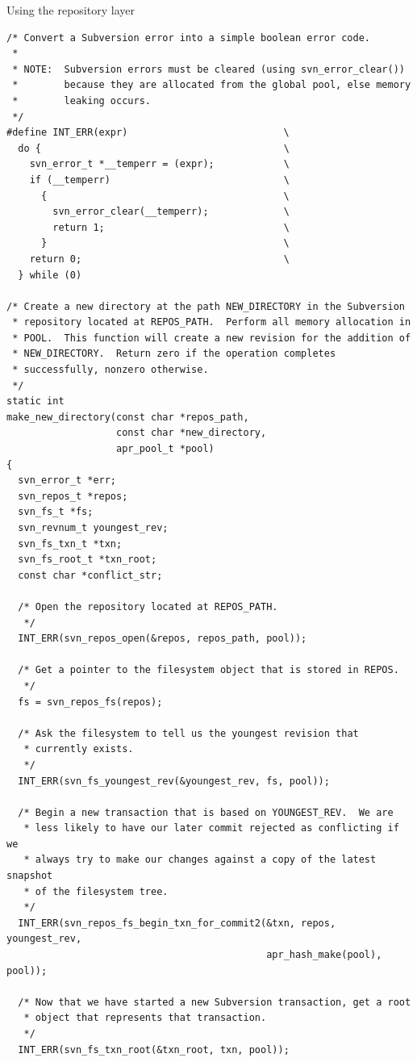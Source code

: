 \protect{}\label{svn.developer.layerlib.repos.ex-1}
Using the repository layer

\begin{verbatim}
/* Convert a Subversion error into a simple boolean error code.
 *
 * NOTE:  Subversion errors must be cleared (using svn_error_clear())
 *        because they are allocated from the global pool, else memory
 *        leaking occurs.
 */
#define INT_ERR(expr)                           \
  do {                                          \
    svn_error_t *__temperr = (expr);            \
    if (__temperr)                              \
      {                                         \
        svn_error_clear(__temperr);             \
        return 1;                               \
      }                                         \
    return 0;                                   \
  } while (0)

/* Create a new directory at the path NEW_DIRECTORY in the Subversion
 * repository located at REPOS_PATH.  Perform all memory allocation in
 * POOL.  This function will create a new revision for the addition of
 * NEW_DIRECTORY.  Return zero if the operation completes
 * successfully, nonzero otherwise.
 */
static int
make_new_directory(const char *repos_path,
                   const char *new_directory,
                   apr_pool_t *pool)
{
  svn_error_t *err;
  svn_repos_t *repos;
  svn_fs_t *fs;
  svn_revnum_t youngest_rev;
  svn_fs_txn_t *txn;
  svn_fs_root_t *txn_root;
  const char *conflict_str;

  /* Open the repository located at REPOS_PATH. 
   */
  INT_ERR(svn_repos_open(&repos, repos_path, pool));

  /* Get a pointer to the filesystem object that is stored in REPOS. 
   */
  fs = svn_repos_fs(repos);

  /* Ask the filesystem to tell us the youngest revision that
   * currently exists. 
   */
  INT_ERR(svn_fs_youngest_rev(&youngest_rev, fs, pool));

  /* Begin a new transaction that is based on YOUNGEST_REV.  We are
   * less likely to have our later commit rejected as conflicting if we
   * always try to make our changes against a copy of the latest snapshot
   * of the filesystem tree. 
   */
  INT_ERR(svn_repos_fs_begin_txn_for_commit2(&txn, repos, youngest_rev,
                                             apr_hash_make(pool), pool));

  /* Now that we have started a new Subversion transaction, get a root
   * object that represents that transaction. 
   */
  INT_ERR(svn_fs_txn_root(&txn_root, txn, pool));
  

\end{verbatim}
